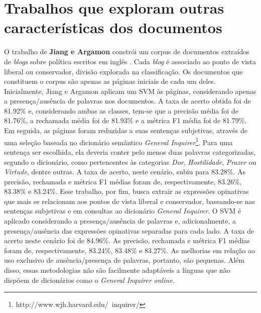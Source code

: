 





\section{Trabalhos que exploram outras características dos documentos}
\label{sintaxe}

O trabalho de \textbf{Jiang e Argamon} constrói um corpus de documentos extraídos de \emph{blogs} sobre política escritos em inglês \cite{jiang-argamon}. Cada \emph{blog} é associado ao ponto de vista liberal ou conservador, divisão explorada na classificação. Os documentos que constituem o corpus são apenas as páginas iniciais de cada um deles. Inicialmente, Jiang e Argamon aplicam um SVM às páginas, considerando apenas a presença/ausência de palavras nos documentos. A taxa de acerto obtida foi de 81.92\% e, considerando ambas as classes, tem-se que a precisão média foi de 81.76\%, a rechamada média foi de 81.93\% e a métrica F1 média foi de 81.79\%. Em seguida, as páginas foram reduzidas a suas sentenças subjetivas, através de uma seleção baseada no dicionário semântico \emph{General Inquirer}\footnote{http://www.wjh.harvard.edu/~inquirer/}. Para uma sentença ser escolhida, ela deveria conter pelo menos duas palavras categorizadas, segundo o dicionário, como pertencentes às categorias \emph{Dor}, \emph{Hostilidade}, \emph{Prazer} ou \emph{Virtude}, dentre outras. A taxa de acerto, neste cenário, subiu para 83.28\%. As precisão, rechamada e métrica F1 médias foram de, respectivamente, 83.26\%, 83.38\% e 83.24\%. Esse trabalho, por fim, busca extrair as expressões opinativas que mais se relacionam aos pontos de vista liberal e conservador, baseando-se nas sentenças subjetivas e em consultas ao dicionário \emph{General Inquirer}. O SVM é aplicado considerando a presença/ausência de palavras e, adicionalmente, a presença/ausência das expressões opinativas separadas para cada lado. A taxa de acerto neste cenário foi de 84.96\%. As precisão, rechamada e métrica F1 médias foram de, respectivamente, 83.24\%, 83.48\% e 83.27\%. As melhorias em relação ao uso exclusivo de ausência/presença de palavras, portanto, são pequenas. Além disso, essas metodologias não são facilmente adaptáveis a línguas que não dispõem de dicionários como o \emph{General Inquirer} \emph{online}.

